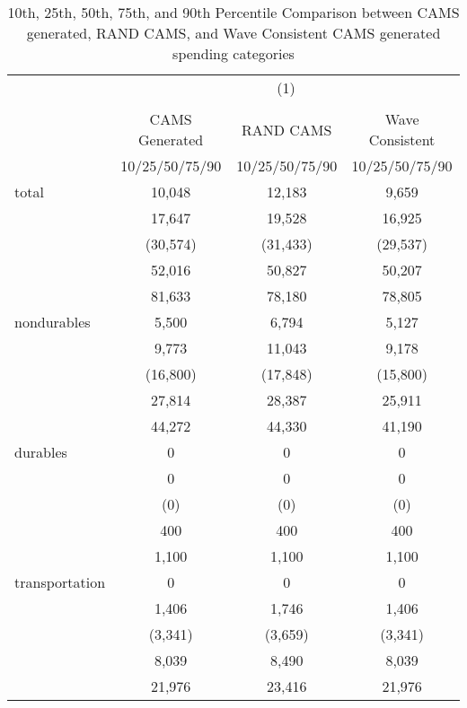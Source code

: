 \begin{table}[htbp]\centering
\def\sym#1{\ifmmode^{#1}\else\(^{#1}\)\fi}
\caption{10th, 25th, 50th, 75th, and 90th Percentile Comparison between CAMS generated, RAND CAMS, and Wave Consistent CAMS generated spending categories }
\begin{tabular}{l*{3}{c}}
\hline\hline
            &\multicolumn{3}{c}{(1)}               \\
            &\multicolumn{3}{c}{}                  \\
            &CAMS Generated&   RAND CAMS&Wave Consistent\\
            &10/25/50/75/90&10/25/50/75/90&10/25/50/75/90\\
\hline
total       &      10,048&      12,183&       9,659\\
            &      17,647&      19,528&      16,925\\
            &    (30,574)&    (31,433)&    (29,537)\\
            &      52,016&      50,827&      50,207\\
            &      81,633&      78,180&      78,805\\
[1em]
nondurables &       5,500&       6,794&       5,127\\
            &       9,773&      11,043&       9,178\\
            &    (16,800)&    (17,848)&    (15,800)\\
            &      27,814&      28,387&      25,911\\
            &      44,272&      44,330&      41,190\\
[1em]
durables    &           0&           0&           0\\
            &           0&           0&           0\\
            &         (0)&         (0)&         (0)\\
            &         400&         400&         400\\
            &       1,100&       1,100&       1,100\\
[1em]
transportation&           0&           0&           0\\
            &       1,406&       1,746&       1,406\\
            &     (3,341)&     (3,659)&     (3,341)\\
            &       8,039&       8,490&       8,039\\
            &      21,976&      23,416&      21,976\\

\end{tabular}
\end{table}
